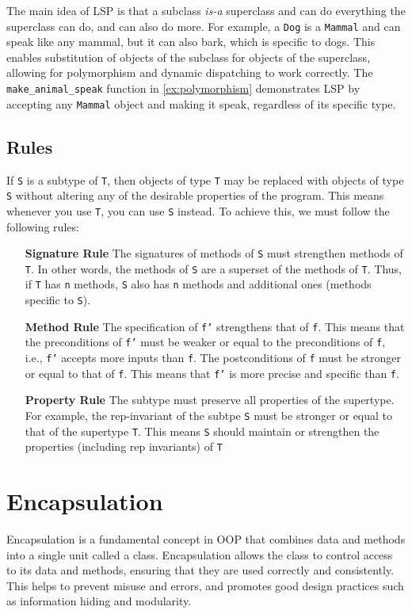 \documentclass[oneside,11pt,dvipsnames]{book}
\newcommand{\code}[1]{\texttt{#1}}
\begin{document}
The main idea of LSP is that a subclass \emph{is-a} superclass and can do everything the superclass can do, and can also do more. For example, a \code{Dog} is a \code{Mammal} and can speak like any mammal, but it can also bark, which is specific to dogs.
This enables substitution of objects of the subclass for objects of the superclass, allowing for polymorphism and dynamic dispatching to work correctly. The \code{make\_animal\_speak} function in \autoref{ex:polymorphism} demonstrates LSP by accepting any \code{Mammal} object and making it speak, regardless of its specific type.


\subsection{Rules} 
If \code{S} is a subtype of \code{T}, then objects of type \code{T} may be replaced with objects of type \code{S} without altering any of the desirable properties of the program. This means whenever you use \code{T}, you can use \code{S} instead. To achieve this, we must follow the following rules:
\begin{itemize}
\item[\textbf{Signature Rule}] The signatures of methods of \code{S} must strengthen methods of \code{T}. In other words, the methods of \code{S} are a superset of the methods of \code{T}. Thus, if \code{T} has \code{n} methods, \code{S} also has \code{n} methods and additional ones (methods specific to \code{S}). 

\item[\textbf{Method Rule}] The specification of \code{f'} strengthens that of \code{f}. This means that the preconditions of \code{f'} must be weaker or equal to the preconditions of \code{f}, i.e.,  \code{f'} accepts more inputs than \code{f}.  The postconditions of \code{f} must be stronger or equal to that of \code{f}. This means that \code{f'} is more precise and specific than \code{f}.

\item[\textbf{Property Rule}] The subtype must preserve all properties of the supertype.  For example, the rep-invariant of the subtpe \code{S} must be stronger or equal to that of the supertype \code{T}. This means \code{S} should maintain or strengthen the properties (including rep invariants) of \code{T}
\end{itemize}


\section{Encapsulation}
Encapsulation is a fundamental concept in OOP that combines data and methods into a single unit called a class. Encapsulation allows the class to control access to its data and methods, ensuring that they are used correctly and consistently. This helps to prevent misuse and errors, and promotes good design practices such as information hiding and modularity.
\end{document}
